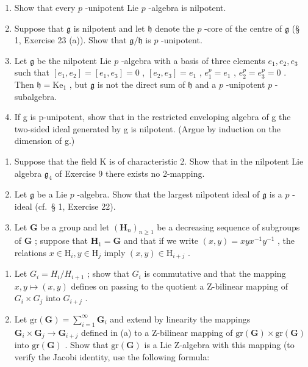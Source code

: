 \begin{enumerate}
\def\labelenumi{(\alph{enumi})}
\item
  Show that every \(p\) -unipotent Lie \(p\) -algebra is nilpotent.
\item
  Suppose that \(\mathfrak{g}\) is nilpotent and let \(\mathfrak{h}\) denote the \(p\) -core of the centre of \(\mathfrak{g}\) (§ 1, Exercise 23 (a)). Show that \(\mathfrak{g} / \mathfrak{h}\) is \(p\) -unipotent.
\item
  Let \(\mathfrak{g}\) be the nilpotent Lie \(p\) -algebra with a basis of three elements \(e_1, e_2, e_3\) such that \([e_1, e_2] = [e_1, e_3] = 0\) , \([e_2, e_3] = e_1\) , \(e_1^p = e_1\) , \(e_2^p = e_3^p = 0\) . Then \(\mathfrak{h} = \mathrm{Ke}_1\) , but \(\mathfrak{g}\) is not the direct sum of \(\mathfrak{h}\) and a \(p\) -unipotent \(p\) -subalgebra.
\item
  If g is p-unipotent, show that in the restricted enveloping algebra of g the two-sided ideal generated by g is nilpotent. (Argue by induction on the dimension of g.)
\end{enumerate}

\begin{enumerate}
\def\labelenumi{\arabic{enumi}.}
\setcounter{enumi}{23}
\item
  Suppose that the field K is of characteristic 2. Show that in the nilpotent Lie algebra \(\mathfrak{g}_4\) of Exercise 9 there exists no 2-mapping.
\item
  Let \(\mathfrak{g}\) be a Lie \(p\) -algebra. Show that the largest nilpotent ideal of \(\mathfrak{g}\) is a \(p\) -ideal (cf.~§ 1, Exercise 22).
\item
  Let \(\mathbf{G}\) be a group and let \((\mathbf{H}_n)_{n\geqslant 1}\) be a decreasing sequence of subgroups of \(\mathbf{G}\) ; suppose that \(\mathbf{H}_1 = \mathbf{G}\) and that if we write \((x,y) = xyx^{-1}y^{-1}\) , the relations \(x\in \mathrm{H}_i,y\in \mathrm{H}_j\) imply \((x,y)\in \mathrm{H}_{i + j}\) .
\end{enumerate}

\begin{enumerate}
\def\labelenumi{(\alph{enumi})}
\item
  Let \(G_{i} = H_{i}/H_{i+1}\) ; show that \(G_{i}\) is commutative and that the mapping \(x, y \mapsto (x, y)\) defines on passing to the quotient a Z-bilinear mapping of \(G_{i} \times G_{j}\) into \(G_{i+j}\) .
\item
  Let \(\mathrm{gr}(\mathbf{G}) = \sum_{i=1}^{\infty} \mathbf{G}_i\) and extend by linearity the mappings \(\mathbf{G}_i \times \mathbf{G}_j \to \mathbf{G}_{i+j}\) defined in (a) to a Z-bilinear mapping of \(\mathrm{gr}(\mathbf{G}) \times \mathrm{gr}(\mathbf{G})\) into \(\mathrm{gr}(\mathbf{G})\) . Show that \(\mathrm{gr}(\mathbf{G})\) is a Lie Z-algebra with this mapping (to verify the Jacobi identity, use the following formula:
\end{enumerate}

